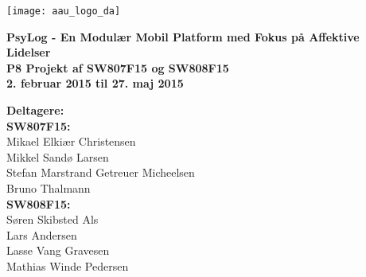 \hspace*{-1cm}\parbox[b][\textheight][t]{\textwidth}
{

\begin{center}
	\texttt{[image: aau\_logo\_da]}\\
	\vspace{0.25cm}
\end{center} 

\vspace{1cm}
\begin{center}

\textbf{\Huge {PsyLog - En Modulær Mobil Platform med Fokus på Affektive Lidelser}} \\ \vspace{0.5cm}
\textbf{\Large P8 Projekt af SW807F15 og SW808F15}\\ \vspace{0.5cm}
\textbf{\large 2. februar 2015 til 27. maj 2015}\\
\end{center}



\vspace{0.25cm}
\begin{center}
\item {\textbf{Deltagere:}} \\
\textbf{SW807F15:}\\
Mikael Elkiær Christensen\\
Mikkel Sandø Larsen\\
Stefan Marstrand Getreuer Micheelsen\\
Bruno Thalmann\\[0.2cm]
\textbf{SW808F15:}\\
Søren Skibsted Als\\
Lars Andersen\\
Lasse Vang Gravesen\\
Mathias Winde Pedersen

\end{center}

\thispagestyle{empty}

\newpage
\thispagestyle{empty}
\mbox{}
}